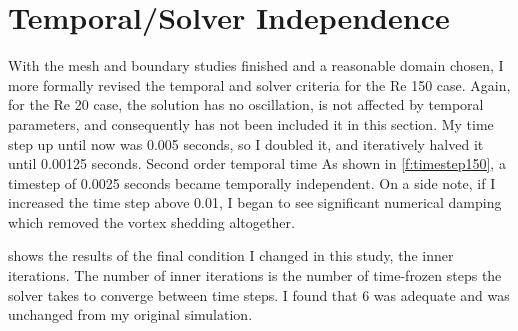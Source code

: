 \documentclass[10pt,english]{article}
\begin{document}
\section{Temporal/Solver Independence}

With the mesh and boundary studies finished and a reasonable domain chosen, I more formally revised the temporal and solver criteria for the Re 150 case.  Again, for the Re 20 case, the solution has no oscillation, is not affected by temporal parameters, and consequently has not been included it in this section.  My time step up until now was 0.005 seconds, so I doubled it, and iteratively halved it until 0.00125 seconds.  Second order temporal time   As shown in \cref{f:timestep150}, a timestep of 0.0025 seconds became temporally independent.  On a side note, if I increased the time step above 0.01, I began to see significant numerical damping which removed the vortex shedding altogether.  

 shows the results of the final condition I changed in this study, the inner iterations.  The number of inner iterations is the number of time-frozen steps the solver takes to converge between time steps.  I found that 6 was adequate and was unchanged from my original simulation.  
\end{document}
